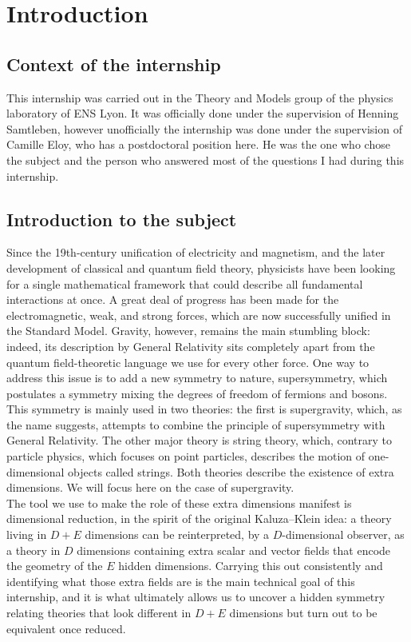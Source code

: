 \documentclass{article}
\begin{document}
\tableofcontents
\clearpage
{} 
\section{Introduction}
\subsection{Context of the internship}
This internship was carried out in the Theory and Models group of the physics laboratory of ENS Lyon. It was officially done under the supervision of Henning Samtleben, 
however unofficially the internship was done under the supervision of Camille Eloy, 
who has a postdoctoral position here. He was the one who chose the subject and the person who answered most of the questions I had during this internship.
\subsection{Introduction to the subject}
Since the 19th-century unification of electricity and magnetism,
and the later development of classical and quantum field theory,
physicists have been looking for a single mathematical framework that could describe all fundamental interactions at once.
A great deal of progress has been made for the electromagnetic,
weak, and strong forces, which are now successfully unified in the Standard Model. Gravity, however,
remains the main stumbling block: indeed, its description by General Relativity \cite{einstein1915allgemeinen}
sits completely apart from the quantum field-theoretic language we use for every other force.
One way to address this issue is to add a new symmetry to nature, supersymmetry, which postulates a symmetry mixing the degrees of freedom of fermions and bosons. This symmetry is mainly used in two theories: the first is supergravity, which, as the name
suggests, attempts to combine the principle of supersymmetry with General Relativity. The other major theory is string theory, which, contrary to particle physics, which focuses on point particles, describes the motion of one-dimensional objects called strings.
Both theories describe the existence of extra dimensions. We will focus here on the case of supergravity.\\
The tool we use to make the role of these extra dimensions manifest is dimensional reduction, in the spirit of the original Kaluza--Klein idea: a theory living in $D+E$ dimensions can be reinterpreted, by a $D$-dimensional observer, as a theory in $D$ dimensions containing extra scalar and vector fields that encode the geometry of the $E$ hidden dimensions. Carrying this out consistently and identifying what those extra fields are is the main technical goal of this internship, and it is what ultimately allows us to uncover a hidden symmetry relating theories that look different in $D+E$ dimensions but turn out to be equivalent once reduced.\\
\end{document}
